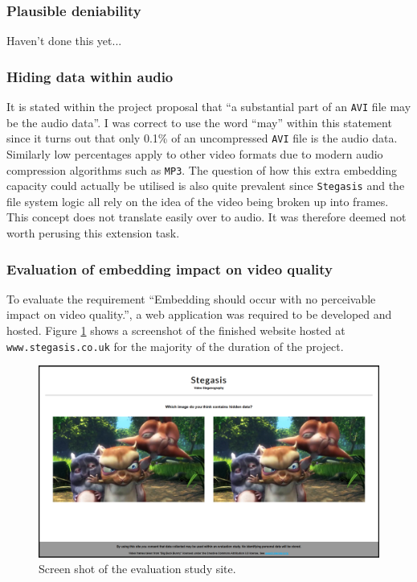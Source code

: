 \documentclass[paper=a4, fontsize=11pt,twoside]{scrartcl}    %
\numberwithin{table}{section}
\numberwithin{figure}{section}
\numberwithin{algorithm}{section}
\begin{document}

\subsubsection{Plausible deniability}

Haven't done this yet...

\subsubsection{Hiding data within audio}

It is stated within the project proposal that ``a substantial part of an \texttt{AVI} file may be the audio data''. I was correct to use the word ``may'' within this statement since it turns out that only 0.1\% of an uncompressed \texttt{AVI} file is the audio data. Similarly low percentages apply to other video formats due to modern audio compression algorithms such as \texttt{MP3}. The question of how this extra embedding capacity could actually be utilised is also quite prevalent since \texttt{Stegasis} and the file system logic all rely on the idea of the video being broken up into frames. This concept does not translate easily over to audio. It was therefore deemed not worth perusing this extension task. 

\subsubsection{Evaluation of embedding impact on video quality}

To evaluate the requirement ``Embedding should occur with no perceivable impact on video quality.'', a web application was required to be developed and hosted. Figure \ref{site} shows a screenshot of the finished website hosted at \texttt{www.stegasis.co.uk} for the majority of the duration of the project.

\begin{figure}[!h]
\centerline{\includegraphics[width=\textwidth]{images/site.png}}
\caption{Screen shot of the evaluation study site.}
\label{site}
\end{figure}
\end{document}
